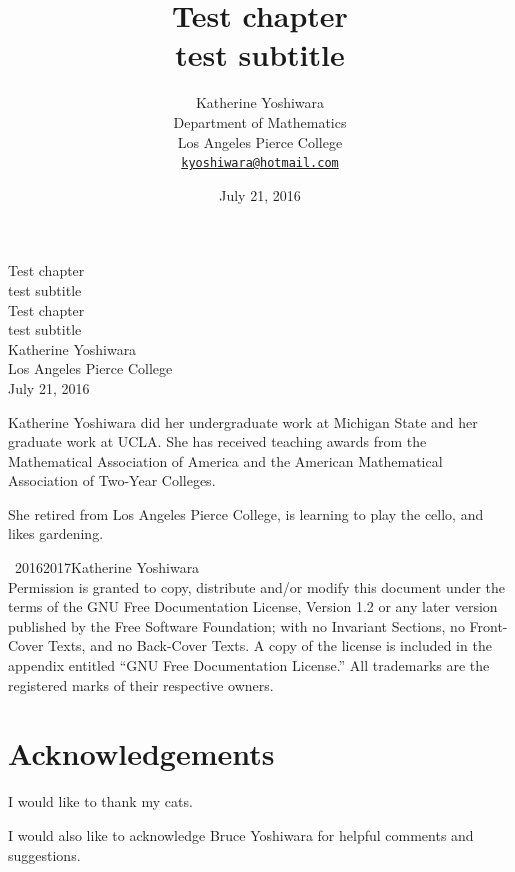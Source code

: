 \documentclass[10pt,]{book}
\title{Test chapter\\
{\large test subtitle}}
\author{Katherine Yoshiwara\\
Department of Mathematics\\
Los Angeles Pierce College\\
\href{mailto:kyoshiwara@hotmail.com}{\nolinkurl{kyoshiwara@hotmail.com}}
}
\date{July 21, 2016}
\theoremstyle{plain}
\theoremstyle{definition}
\theoremstyle{definition}
\theoremstyle{definition}
\theoremstyle{definition}
\numberwithin{equation}{section}
\begin{document}
\frontmatter
\thispagestyle{empty}
{\centering
\vspace*{0.28\textheight}
{\Huge Test chapter}\\[2\baselineskip]
{\LARGE test subtitle}\\
}
\clearpage
\thispagestyle{empty}
\null%
\clearpage
\thispagestyle{empty}
{\centering
\vspace*{0.14\textheight}
{\Huge Test chapter}\\[\baselineskip]
{\LARGE test subtitle}\\[3\baselineskip]
{\Large Katherine Yoshiwara}\\[0.5\baselineskip]
{\Large Los Angeles Pierce College}\\[3\baselineskip]
{\Large July 21, 2016}\\}
\clearpage
\thispagestyle{empty}
\noindent

            Katherine Yoshiwara did her undergraduate work at Michigan State and her graduate work at UCLA. She has received teaching awards from the Mathematical Association of America and the American Mathematical Association of Two-Year Colleges.
\par

            She retired from Los Angeles Pierce College, is learning to play the cello, and likes gardening.%
\par
{}
\noindent\textcopyright\ 2016\textendash{}2017\quad{}Katherine Yoshiwara\\[0.5\baselineskip]
Permission is granted to copy, distribute and/or modify this document under the terms of the GNU Free Documentation License, Version 1.2 or any later version published by the Free Software Foundation; with no Invariant Sections, no Front-Cover Texts, and no Back-Cover Texts.  A copy of the license is included in the appendix entitled ``GNU Free Documentation License.''  All trademarks\texttrademark{} are the registered\textregistered{} marks of their respective owners.\par
{}
\null\clearpage
\chapter*{Acknowledgements}\label{acknowledgement-1}
I would like to thank my cats.%
\par
I would also like to acknowledge Bruce Yoshiwara for  helpful comments and suggestions. %
\end{document}
